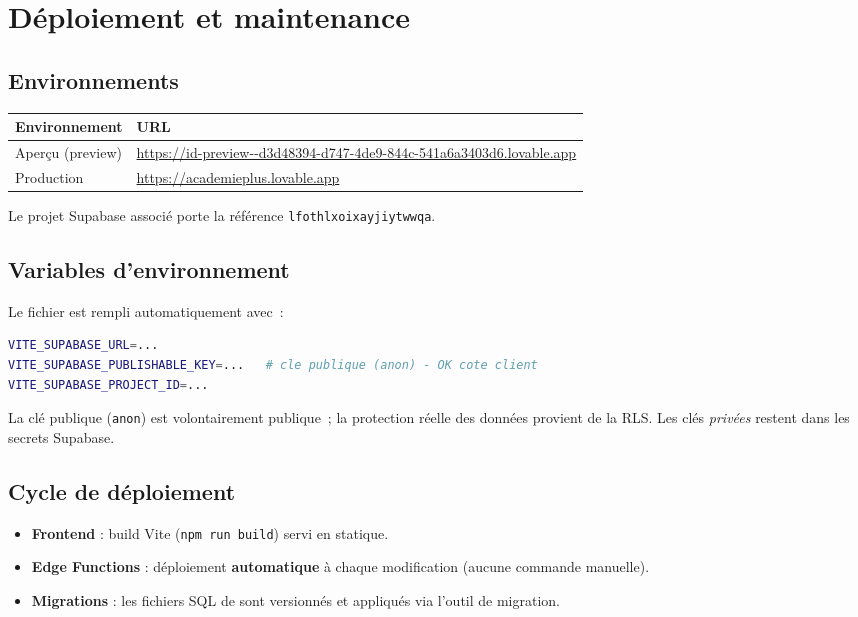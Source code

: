\chapter{Déploiement et maintenance}

\section{Environnements}
\begin{longtable}{p{4cm}p{10.5cm}}
\toprule \textbf{Environnement} & \textbf{URL} \\ \midrule \endhead
Aperçu (preview) & \url{https://id-preview--d3d48394-d747-4de9-844c-541a6a3403d6.lovable.app} \\
Production & \url{https://academieplus.lovable.app} \\
\bottomrule
\end{longtable}

Le projet Supabase associé porte la référence \texttt{lfothlxoixayjiytwwqa}.

\section{Variables d'environnement}
Le fichier  est rempli automatiquement avec~:
\begin{lstlisting}[language=bash]
VITE_SUPABASE_URL=...
VITE_SUPABASE_PUBLISHABLE_KEY=...   # cle publique (anon) - OK cote client
VITE_SUPABASE_PROJECT_ID=...
\end{lstlisting}
La clé publique (\texttt{anon}) est volontairement publique~; la protection
réelle des données provient de la RLS. Les clés \emph{privées} restent dans les
secrets Supabase.

\section{Cycle de déploiement}
\begin{itemize}
  \item \textbf{Frontend} : build Vite (\texttt{npm run build}) servi en statique.
  \item \textbf{Edge Functions} : déploiement \textbf{automatique} à chaque
        modification (aucune commande manuelle).
  \item \textbf{Migrations} : les fichiers SQL de 
        sont versionnés et appliqués via l'outil de migration.
\end{itemize}

